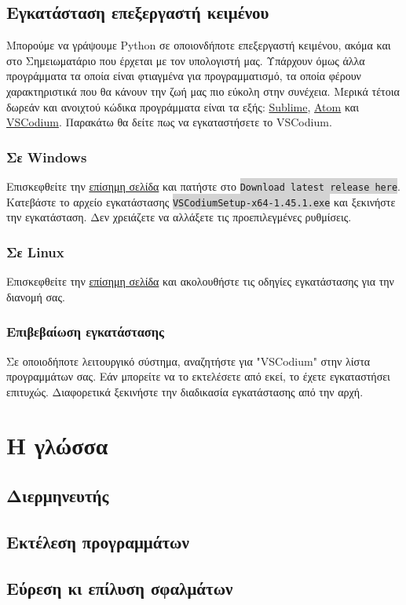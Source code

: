 \documentclass[a4paper,10pt]{report}
\begin{document}
\subsection{Εγκατάσταση επεξεργαστή κειμένου}
Μπορούμε να γράψουμε Python σε οποιονδήποτε επεξεργαστή κειμένου, ακόμα και
στο Σημειωματάριο που έρχεται με τον υπολογιστή μας. Υπάρχουν όμως άλλα
προγράμματα τα οποία είναι φτιαγμένα για προγραμματισμό, τα οποία φέρουν
χαρακτηριστικά που θα κάνουν την ζωή μας πιο εύκολη στην συνέχεια. Μερικά
τέτοια δωρεάν και ανοιχτού κώδικα προγράμματα είναι τα εξής:
\href{https://tinyurl.com/hh3vvrn}{Sublime},
\href{https://tinyurl.com/l2uxckn}{Atom} και
\href{https://tinyurl.com/y54gclet}{VSCodium}. Παρακάτω θα δείτε πως να
εγκαταστήσετε το VSCodium.
\subsubsection{Σε Windows}
Επισκεφθείτε την \href{https://tinyurl.com/ybqxegq3}{επίσημη σελίδα}
και πατήστε στο \colorbox{lightgray}{\lstinline{Download latest release here}}.
Κατεβάστε το αρχείο εγκατάστασης
\colorbox{lightgray}{\lstinline{VSCodiumSetup-x64-1.45.1.exe}} και ξεκινήστε
την εγκατάσταση. Δεν χρειάζετε να αλλάξετε τις προεπιλεγμένες ρυθμίσεις.
\subsubsection{Σε Linux}
Επισκεφθείτε την \href{https://tinyurl.com/ybqxegq3}{επίσημη σελίδα} και
ακολουθήστε τις οδηγίες εγκατάστασης για την διανομή σας.
\subsubsection{Επιβεβαίωση εγκατάστασης}
Σε οποιοδήποτε λειτουργικό σύστημα, αναζητήστε για "VSCodium" στην λίστα
προγραμμάτων σας. Εάν μπορείτε να το εκτελέσετε από εκεί, το έχετε εγκαταστήσει
επιτυχώς. Διαφορετικά ξεκινήστε την διαδικασία εγκατάστασης από την αρχή.
\section{Η γλώσσα}
\subsection{Διερμηνευτής}
\subsection{Εκτέλεση προγραμμάτων}
\subsection{Εύρεση κι επίλυση σφαλμάτων}
\end{document}
